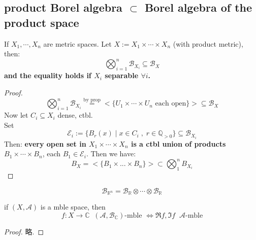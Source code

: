 \documentclass[lang=cn,11pt]{elegantbook}
\begin{document}
\subsection{product Borel algebra $\subset$ Borel algebra of the product space}
\begin{proposition}
    If $X_1,\cdots, X_n $ are metric spaces. Let $X := X_1 \times \cdots \times X_n$ (with product metric), then: $$\bigotimes_{i=1}^n \mathcal{B}_{X_i} \subseteq \mathcal{B}_X$$
\textbf{and the equality holds if $X_i$ separable $\forall i$.}
\end{proposition}
\begin{proof}
   $$\bigotimes_{i=1}^n \mathcal{B}_{X_i}  \overset{\text{by prop}}{=} < \{ U_1\times \cdots \times U_n  \text{ each open} \} > \subseteq\mathcal{B}_X $$
   Now let $C_i \subseteq X_i$ dense, ctbl. \\
   Set $$\mathcal{E}_i  := \{  B_r(x) \mid x\in C_i \;,\; r\in \mathbb{Q}_{>0}  \} \subseteq \mathcal{B}_{X_i} $$
   Then: \textbf{every open set in $X_1 \times \cdots \times X_n$ is a ctbl union of products $B_1 \times \cdots \times B_n$}, each $B_1 \in \mathcal{E}_i$.
   Then we have: $$B_X = <\{B_1 \times ...\times B_n\}> \subset \bigotimes_1^n B_{X_i}$$
\end{proof}

\begin{example}
    $$\mathcal{B}_{\mathbb{R}^n} = \mathcal{B}_{\mathbb{R}} \otimes \cdots \otimes \mathcal{B}_{\mathbb{R}}$$
\end{example}


\begin{corollary}
    if $(X,\mathcal{A})$ is a mble space, then $$f:X\rightarrow \mathbb{C}  \;\;(\mathcal{A},\mathcal{B}_{\mathbb{C}})\text{-mble } \Longleftrightarrow \Re f, \Im f \;\;\mathcal{A}\text{-mble}$$
\end{corollary}
\begin{proof}
    略.
\end{proof}
\end{document}
